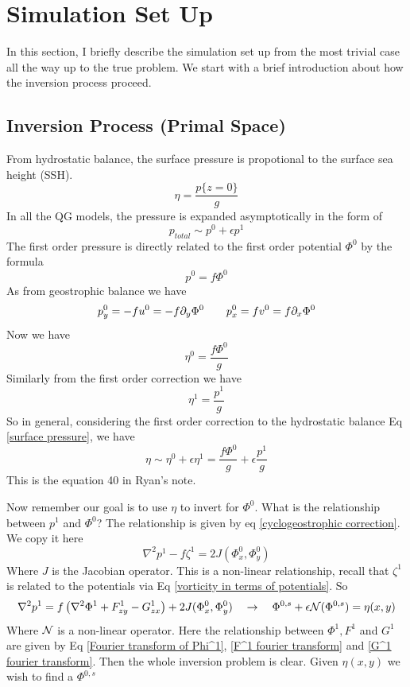 \documentclass[../SQG_notes.tex]{subfiles}
\begin{document}
\section{Simulation Set Up}

In this section, I briefly describe the simulation set up from the most trivial case all the way up to the true problem. We start with a brief introduction about how the inversion process proceed. 

\subsection{Inversion Process (Primal Space)}
From hydrostatic balance, the surface pressure is propotional to the surface sea height (SSH). 
\begin{equation}
    \eta = \frac{p\{z = 0\}}{g} \label{surface pressure}
\end{equation}
In all the QG models, the pressure is expanded asymptotically in the form of 
\begin{equation}
    p_{total} \sim p^0 + \epsilon p^1
\end{equation}
The first order pressure is directly related to the first order potential $\Phi^0$ by the formula 
\[ p^0 = f\Phi^0\]
As from geostrophic balance we have 
\[ p^0_y = -f u^0 = -f \partial_y \Phi^0 \qquad p^0_x = f v^0 = f \partial_x \Phi^0\]
Now we have 
\[ \eta^0 = \frac{f\Phi^0}{g}\]
Similarly from the first order correction we have 
\[ \eta^1 = \frac{p^1}{g}\]
So in general, considering the first order correction to the hydrostatic balance Eq \ref{surface pressure}, we have 
\begin{equation}
    \eta \sim \eta^0 + \epsilon\eta^1 = \frac{f\Phi^0}{g} +\epsilon \frac{p^1}{g} \label{True sea surface height}
\end{equation}
This is the equation 40 in Ryan's note. \par

Now remember our goal is to use $\eta$ to invert for $\Phi^0$. What is the relationship between $p^1$ and $\Phi^0$? The relationship is given by eq \ref{cyclogeostrophic correction}. We copy it here 
\[
\boxed{\nabla^2 p^1 - f\zeta^1 = 2J(\Phi_x^0, \Phi_y^0)}
\]
Where $J$ is the Jacobian operator. This is a non-linear relationship, recall that $\zeta^1$ is related to the potentials via Eq \ref{vorticity in terms of potentials}. So 
\[
\nabla^2 p^1 = f\left(\nabla^2\Phi^1 + F_{zy}^1 - G_{zx}^1\right) + 2J(\Phi_x^0, \Phi_y^0) \quad \rightarrow \quad \Phi^{0,s} + \epsilon \mathcal{N}(\Phi^{0,s}) = \eta(x,y)
\]
Where $\mathcal{N}$ is a non-linear operator. Here the relationship between $\Phi^1, F^1$ and $G^1$ are given by Eq \ref{Fourier transform of Phi^1}, \ref{F^1 fourier transform} and \ref{G^1 fourier transform}. Then the whole inversion problem is clear. Given $\eta(x,y)$ we wish to find a $\Phi^{0,s}$ 
\end{document}
